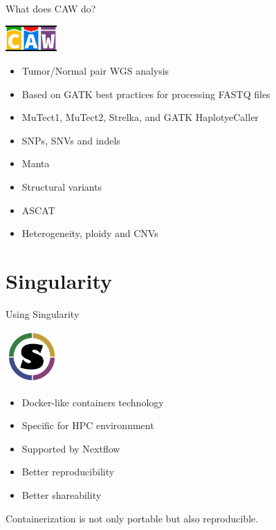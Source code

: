 \documentclass{beamer}
\begin{document}
\begin{frame}{What does CAW do?}
	\begin{center}
		\includegraphics[height=1cm]{pictures/CAW}
	\end{center}
	\pause
	\begin{itemize}
		\item Tumor/Normal pair WGS analysis
		\pause
		\item Based on GATK best practices for processing FASTQ files
		\pause
		\item<4> MuTect1, MuTect2, Strelka, and GATK HaplotyeCaller
		\item<5-> SNPs, SNVs and indels
		\pause
		\item<6> Manta
		\item<7-> Structural variants
		\pause
		\item<8> ASCAT
		\item<9-> Heterogeneity, ploidy and CNVs
	\end{itemize}
\end{frame}

\section{Singularity}

\begin{frame}{Using Singularity}
	\begin{center}
		\includegraphics[height=2cm]{pictures/singularity.png}
	\end{center}
	\begin{itemize}
		\item Docker-like containers technology
		\item Specific for HPC environnment
		\pause
		\item Supported by Nextflow
		\pause
		\item Better reproducibility
		\item Better shareability
		\pause
	\end{itemize}
	Containerization is not only portable but also reproducible.
\end{frame}
\end{document}
